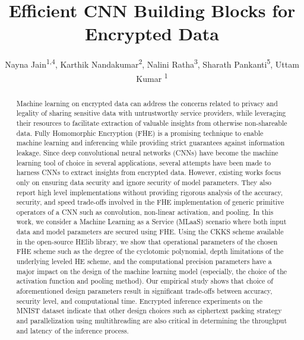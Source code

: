\documentclass[letterpaper]{article} %
\title{Efficient CNN Building Blocks for Encrypted Data}
\author{
        Nayna Jain\textsuperscript{\rm 1,4},
        Karthik Nandakumar\textsuperscript{\rm 2},
        Nalini Ratha\textsuperscript{\rm 3},
        Sharath Pankanti\textsuperscript{\rm 5},
        Uttam Kumar \textsuperscript{\rm 1}\\}
\begin{document}


\maketitle

\begin{abstract}
Machine learning on encrypted data can address the concerns related to privacy and legality of sharing sensitive data with untrustworthy service providers, while leveraging their resources to facilitate extraction of valuable insights from otherwise non-shareable data. Fully Homomorphic Encryption (FHE) is a promising technique to enable machine learning and inferencing while providing strict guarantees against information leakage. Since deep convolutional neural networks (CNNs) have become the machine learning tool of choice in several applications, several attempts have been made to harness CNNs to extract insights from encrypted data. However, existing works focus only on ensuring data security and ignore security of model parameters. They also report high level implementations without providing rigorous analysis of the accuracy, security, and speed trade-offs involved in the FHE implementation of generic primitive operators of a CNN such as convolution, non-linear activation, and pooling. In this work, we consider a Machine Learning as a Service (MLaaS) scenario where both input data and model parameters are secured using FHE. Using the CKKS scheme available in the open-source HElib library, we show that operational parameters of the chosen FHE scheme such as the degree of the cyclotomic polynomial, depth limitations of the underlying leveled HE scheme, and the computational precision parameters have a major impact on the design of the machine learning model (especially, the choice of the activation function and pooling method). Our empirical study shows that choice of aforementioned design parameters result in significant trade-offs between accuracy, security level, and computational time. Encrypted inference experiments on the MNIST dataset indicate that other design choices such as ciphertext packing strategy and parallelization using multithreading are also critical in determining the throughput and latency of the inference process.
\end{abstract}
\end{document}

